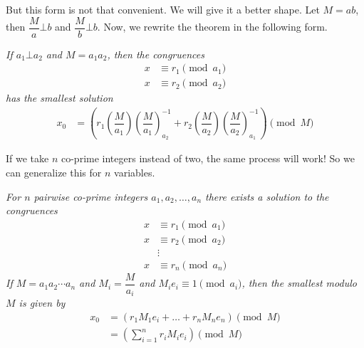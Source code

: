 \documentclass{subfile}
\begin{document}
	But this form is not that convenient. We will give it a better shape. Let $M=ab$, then $\dfrac{M}{a}\bot b$ and $\dfrac{M}{b}\bot b$. Now, we rewrite the theorem in the following form.
	\begin{theorem}\slshape
		If $a_1\bot a_2$ and $M=a_1a_2$, then the congruences	
		\begin{align*}
		x & \equiv r_1\pmod{a_1}\\
		x & \equiv r_2\pmod{a_2}
		\end{align*}
		has the smallest solution
		\begin{align*}
		x_0 & = 
		\left(r_1\left(\dfrac{M}{a_1}\right)\left(\dfrac{M}{a_1}\right)^{-1}_{a_2}+r_2\left(\dfrac{M}{a_2}\right)\left(\dfrac{M}{a_2}\right)^{-1}_{a_1}\right)\pmod{M}
		\end{align*}
	\end{theorem}
	If we take $n$ co-prime integers instead of two, the same process will work! So we can generalize this for $n$ variables.
	\begin{theorem}[CRT]\slshape
		For $n$ pairwise co-prime integers $a_1,a_2,\ldots,a_n$ there exists a solution to the congruences
		\begin{align*}
		x & \equiv r_1\pmod{a_1}\\
		x & \equiv r_2\pmod{a_2}\\
		& \vdots\\
		x & \equiv r_n\pmod{a_n}
		\end{align*}
		If $M=a_1a_2\cdots a_n$ and $M_i=\dfrac{M}{a_i}$ and $M_ie_i\equiv1\pmod{a_i}$, then the smallest  modulo $M$ is given by
		\begin{align*}
		x_0 & = \left(r_1 M_1e_i+\ldots+r_n M_ne_n\right)\pmod{M}\\
		& = \left(\sum_{i=1}^{n} r_i M_ie_i\right)\pmod M
		\end{align*}
	\end{theorem}
	
\end{document}
